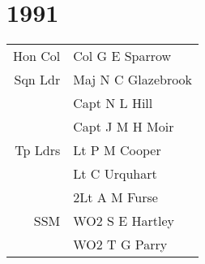 \chapter*{1991}

\begin{center}
  \small
  \begin{tabular}{rl}
    Hon Col & Col G E Sparrow \\
    Sqn Ldr & Maj N C Glazebrook \\
      & Capt N L Hill \\
      & Capt J M H Moir \\
    Tp Ldrs & Lt P M Cooper \\
      & Lt C Urquhart \\
      & 2Lt A M Furse \\
    SSM & WO2 S E Hartley \\
      & WO2 T G Parry \\
  \end{tabular}
\end{center}

